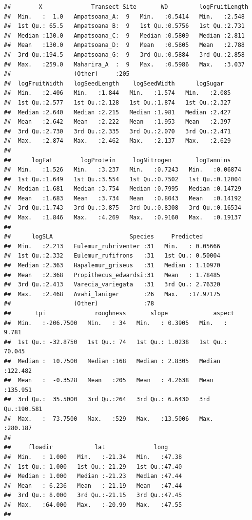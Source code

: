 \documentclass[
  12pt,
]{article}
\begin{document}
\begin{verbatim}
##        X              Transect_Site       WD         logFruitLength 
##  Min.   :  1.0   Ampatsoana_A:  9   Min.   :0.5414   Min.   :2.548  
##  1st Qu.: 65.5   Ampatsoana_B:  9   1st Qu.:0.5756   1st Qu.:2.731  
##  Median :130.0   Ampatsoana_C:  9   Median :0.5809   Median :2.811  
##  Mean   :130.0   Ampatsoana_D:  9   Mean   :0.5805   Mean   :2.788  
##  3rd Qu.:194.5   Ampatsoana_G:  9   3rd Qu.:0.5884   3rd Qu.:2.858  
##  Max.   :259.0   Maharira_A  :  9   Max.   :0.5986   Max.   :3.037  
##                  (Other)     :205                                   
##  logFruitWidth   logSeedLength    logSeedWidth      logSugar    
##  Min.   :2.406   Min.   :1.844   Min.   :1.574   Min.   :2.085  
##  1st Qu.:2.577   1st Qu.:2.128   1st Qu.:1.874   1st Qu.:2.327  
##  Median :2.640   Median :2.215   Median :1.981   Median :2.427  
##  Mean   :2.642   Mean   :2.222   Mean   :1.953   Mean   :2.397  
##  3rd Qu.:2.730   3rd Qu.:2.335   3rd Qu.:2.070   3rd Qu.:2.471  
##  Max.   :2.874   Max.   :2.462   Max.   :2.137   Max.   :2.629  
##                                                                 
##      logFat        logProtein     logNitrogen       logTannins     
##  Min.   :1.526   Min.   :3.237   Min.   :0.7243   Min.   :0.06874  
##  1st Qu.:1.649   1st Qu.:3.554   1st Qu.:0.7502   1st Qu.:0.12004  
##  Median :1.681   Median :3.754   Median :0.7995   Median :0.14729  
##  Mean   :1.683   Mean   :3.734   Mean   :0.8043   Mean   :0.14192  
##  3rd Qu.:1.743   3rd Qu.:3.875   3rd Qu.:0.8308   3rd Qu.:0.16534  
##  Max.   :1.846   Max.   :4.269   Max.   :0.9160   Max.   :0.19137  
##                                                                    
##      logSLA                      Species     Predicted       
##  Min.   :2.213   Eulemur_rubriventer :31   Min.   : 0.05666  
##  1st Qu.:2.332   Eulemur_rufifrons   :31   1st Qu.: 0.50004  
##  Median :2.363   Hapalemur_griseus   :31   Median : 1.10970  
##  Mean   :2.368   Propithecus_edwardsi:31   Mean   : 1.78485  
##  3rd Qu.:2.413   Varecia_variegata   :31   3rd Qu.: 2.76320  
##  Max.   :2.468   Avahi_laniger       :26   Max.   :17.97175  
##                  (Other)             :78                     
##       tpi              roughness       slope             aspect       
##  Min.   :-206.7500   Min.   : 34   Min.   : 0.3905   Min.   :  9.781  
##  1st Qu.: -32.8750   1st Qu.: 74   1st Qu.: 1.0238   1st Qu.: 70.045  
##  Median :  10.7500   Median :168   Median : 2.8305   Median :122.482  
##  Mean   :  -0.3528   Mean   :205   Mean   : 4.2638   Mean   :135.951  
##  3rd Qu.:  35.5000   3rd Qu.:264   3rd Qu.: 6.6430   3rd Qu.:190.581  
##  Max.   :  73.7500   Max.   :529   Max.   :13.5006   Max.   :280.187  
##                                                                       
##     flowdir            lat              long      
##  Min.   : 1.000   Min.   :-21.34   Min.   :47.38  
##  1st Qu.: 1.000   1st Qu.:-21.29   1st Qu.:47.40  
##  Median : 1.000   Median :-21.23   Median :47.44  
##  Mean   : 6.236   Mean   :-21.19   Mean   :47.44  
##  3rd Qu.: 8.000   3rd Qu.:-21.15   3rd Qu.:47.45  
##  Max.   :64.000   Max.   :-20.99   Max.   :47.55  
## 
\end{verbatim}
\end{document}
